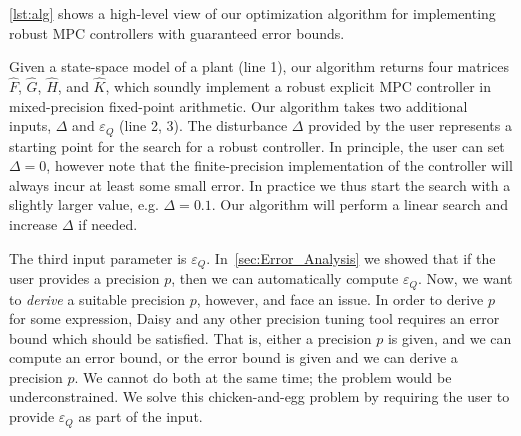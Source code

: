 \autoref{lst:alg} shows a high-level view of our optimization algorithm for
implementing robust MPC controllers with guaranteed error bounds.

Given a state-space model of a plant (line 1), our algorithm returns four matrices
$\hat{F}$, $\hat{G}$, $\hat{H}$, and $\hat{K}$,
which soundly implement a robust explicit MPC controller in mixed-precision
fixed-point arithmetic.
Our algorithm takes two additional inputs, $\Delta$ and $\varepsilon_Q$ (line 2, 3). 
The disturbance $\Delta$ provided by the user represents a starting point for 
the search for a robust controller. In principle, the user can set $\Delta = 0$,
however note that the finite-precision implementation of the controller will always
incur at least some small error. In practice we thus start the search with a slightly
larger value, e.g. $\Delta = 0.1$. Our algorithm will perform a linear search and
increase $\Delta$ if needed.

The third input parameter is $\varepsilon_Q$. In~\autoref{sec:Error_Analysis} we
showed that if the user provides a precision $p$, then we can automatically
compute $\varepsilon_Q$.
Now, we want to \emph{derive} a suitable precision $p$, however, and face an
issue. In order to derive $p$ for some expression, Daisy and any other precision
tuning tool requires an error bound which should be satisfied. That is, either a
precision $p$ is given, and we can compute an error bound, or the error bound is
given and we can derive a precision $p$. We cannot do both at the same time; the
problem would be underconstrained. We solve this chicken-and-egg problem by
requiring the user to provide $\varepsilon_Q$ as part of the input.

